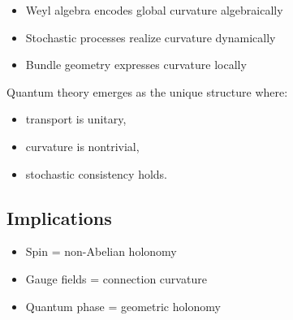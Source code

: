 \documentclass[11pt]{article}
\begin{document}
\begin{itemize}
\item Weyl algebra encodes global curvature algebraically
\item Stochastic processes realize curvature dynamically
\item Bundle geometry expresses curvature locally
\end{itemize}

Quantum theory emerges as the unique structure where:
\begin{itemize}
\item transport is unitary,
\item curvature is nontrivial,
\item stochastic consistency holds.
\end{itemize}

\subsection{Implications}

\begin{itemize}
\item Spin = non-Abelian holonomy
\item Gauge fields = connection curvature
\item Quantum phase = geometric holonomy
\end{itemize}
\end{document}
